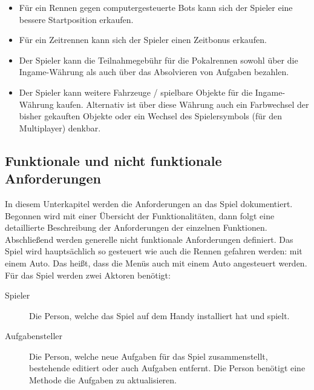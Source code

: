 \begin{enumerate}
		\begin{itemize}
			\item{Für ein Rennen gegen computergesteuerte Bots kann sich der Spieler eine bessere Startposition erkaufen.}
			\item{Für ein Zeitrennen kann sich der Spieler einen Zeitbonus erkaufen.}
			\item{Der Spieler kann die Teilnahmegebühr für die Pokalrennen sowohl über die Ingame-Währung als auch über das Absolvieren von Aufgaben bezahlen.}
			\item{Der Spieler kann weitere Fahrzeuge / spielbare Objekte für die Ingame-Währung kaufen. Alternativ ist über diese Währung auch ein Farbwechsel der bisher gekauften Objekte oder ein Wechsel des Spielersymbols (für den Multiplayer) denkbar.}
		\end{itemize}
	\end{enumerate}

\subsection{Funktionale und nicht funktionale Anforderungen}\label{ssec:requirements}
	In diesem Unterkapitel werden die Anforderungen an das Spiel dokumentiert. Begonnen wird mit einer Übersicht der Funktionalitäten, dann folgt eine detaillierte Beschreibung der Anforderungen der einzelnen Funktionen. Abschließend werden generelle nicht funktionale Anforderungen definiert.
	Das Spiel wird hauptsächlich so gesteuert wie auch die Rennen gefahren werden: mit einem Auto. Das heißt, dass die Menüs auch mit einem Auto angesteuert werden.
	Für das Spiel werden zwei Aktoren benötigt:
	\begin{description}
		\item[Spieler]{ Die Person, welche das Spiel auf dem Handy installiert hat und spielt. }
		\item[Aufgabensteller]{ Die Person, welche neue Aufgaben für das Spiel zusammenstellt, bestehende editiert oder auch Aufgaben entfernt. Die Person benötigt eine Methode die Aufgaben zu aktualisieren. }
	\end{description}

